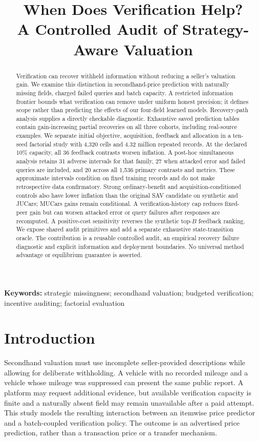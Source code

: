 \documentclass[11pt]{article}
\title{When Does Verification Help?\\A Controlled Audit of Strategy-Aware Valuation}
\author{}
\date{}
\begin{document}
\maketitle
\begin{abstract}
Verification can recover withheld information without reducing a seller's
valuation gain. We examine this distinction in secondhand-price prediction
with naturally missing fields, charged failed queries and batch capacity.
A restricted information frontier bounds what verification can remove under
uniform honest precision; it defines scope rather than predicting the effects
of our four-field learned models. Recovery-path analysis supplies a directly
checkable diagnostic. Exhaustive saved prediction tables contain gain-increasing
partial recoveries on all three cohorts, including real-source examples.
We separate initial objective, acquisition, feedback and allocation in a
ten-seed factorial study with 4,320 cells and 4.32 million repeated records.
At the declared 10\% capacity, all 36 feedback contrasts worsen inflation.
A post-hoc simultaneous analysis retains 31 adverse intervals for that family,
27 when attacked error and failed queries are included, and 20 across all
1,536 primary contrasts and metrics. These approximate intervals condition
on fixed training records and do not make retrospective data confirmatory.
Strong ordinary-benefit and acquisition-conditioned controls also have lower
inflation than the original SAV candidate on synthetic and JUCars; MUCars gains
remain conditional. A verification-history cap reduces fixed-peer gain but
can worsen attacked error or query failures after responses are recomputed.
A positive-cost sensitivity reverses the synthetic top-$B$ feedback ranking.
We expose shared audit primitives and add a separate exhaustive state-transition
oracle. The contribution is a reusable controlled audit, an empirical recovery
failure diagnostic and explicit information and deployment boundaries. No
universal method advantage or equilibrium guarantee is asserted.
\end{abstract}
\noindent\textbf{Keywords:} strategic missingness; secondhand valuation; budgeted verification; incentive auditing; factorial evaluation

\section{Introduction}\label{sec:introduction}
Secondhand valuation must use incomplete seller-provided descriptions while
allowing for deliberate withholding. A vehicle with no recorded mileage and a
vehicle whose mileage was suppressed can present the same public report. A
platform may request additional evidence, but available verification capacity
is finite and a naturally absent field may remain unavailable after a paid
attempt. This study models the resulting interaction between an itemwise price
predictor and a batch-coupled verification policy. The outcome is an advertised
price prediction, rather than a transaction price or a transfer mechanism.
\end{document}
